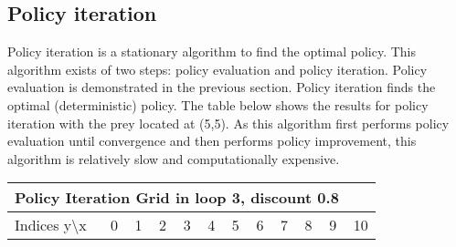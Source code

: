 \documentclass{article}
\begin{document}
\subsection*{Policy iteration}
Policy iteration is a stationary algorithm to find the optimal policy. This algorithm exists of two steps: policy evaluation and policy iteration. Policy evaluation is demonstrated in the previous section. Policy iteration finds the optimal (deterministic) policy. The table below shows the results for policy iteration with the prey located at (5,5). As this algorithm first performs policy evaluation until convergence and then performs policy improvement, this algorithm is relatively slow and computationally expensive.
\begin{center}
\scalebox{0.6}
	{
		\begin{tabular}{ |l | l | l | l | l | l | l | l | l | l | l | l|}
		\hline
		\multicolumn{11}{|c|}{Policy Iteration Grid  in loop 3, discount 0.8}\\
		\hline
		Indices y\textbackslash x &0 & 1 & 2 & 3 & 4 & 5 & 6 & 7 & 8 & 9 & 10 \\ 


\end{tabular}}
\end{center}
\end{document}
